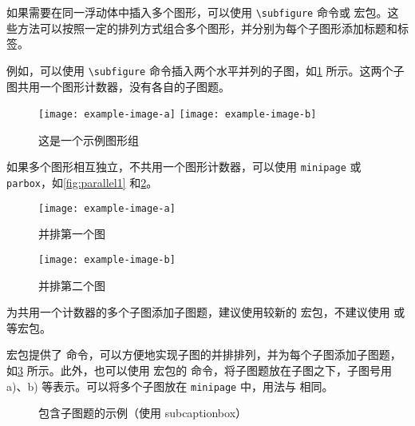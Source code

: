 如果需要在同一浮动体中插入多个图形，可以使用 \verb|\subfigure| 命令或  宏包。这些方法可以按照一定的排列方式组合多个图形，并分别为每个子图形添加标题和标签。

例如，可以使用 \verb|\subfigure| 命令插入两个水平并列的子图，如\cref{fig:example-subfig-1} 所示。这两个子图共用一个图形计数器，没有各自的子图题。

\begin{figure}[!htp]
  \centering
  \texttt{[image: example-image-a]}
  \hspace{1cm}
  \texttt{[image: example-image-b]}
  \caption{这是一个示例图形组}
  \label{fig:example-subfig-1}
\end{figure}

如果多个图形相互独立，不共用一个图形计数器，可以使用 \texttt{minipage} 或 \texttt{parbox}，如\cref{fig:parallel1} 和\cref{fig:parallel2}。

\begin{figure}[!htp]
  \begin{minipage}{0.4\textwidth}
    \centering
    \texttt{[image: example-image-a]}
    \caption{并排第一个图}
    \label{fig:parallel1}
  \end{minipage}\hfill
  \begin{minipage}{0.4\textwidth}
    \centering
    \texttt{[image: example-image-b]}
    \caption{并排第二个图}
    \label{fig:parallel2}
  \end{minipage}
\end{figure}

为共用一个计数器的多个子图添加子图题，建议使用较新的  宏包，不建议使用  或  等宏包。

 宏包提供了  命令，可以方便地实现子图的并排排列，并为每个子图添加子图题，如\cref{fig:subcaptionbox} 所示。此外，也可以使用  宏包的  命令，将子图题放在子图之下，子图号用 a)、b) 等表示。可以将多个子图放在 \texttt{minipage} 中，用法与  相同。

\begin{figure}[!htp]
  \centering
  \hspace{1cm}
  \caption{包含子图题的示例（使用 subcaptionbox）}
  \label{fig:subcaptionbox}
\end{figure}

